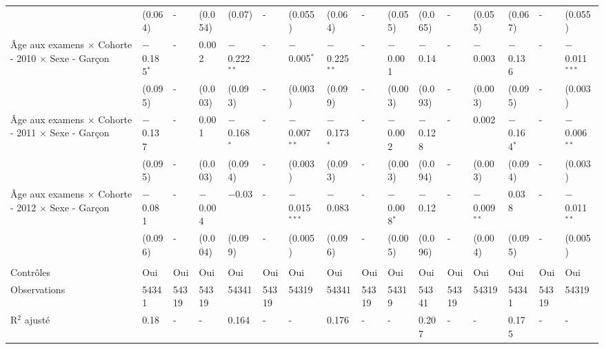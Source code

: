 \documentclass[
]{book}
\begin{document}
\begin{ThreePartTable}
\begin{longtable}[t]{llllllllllllllll}
 & (0.064) & - & (0.054) & (0.07) & - & (0.055) & (0.064) & - & (0.055) & (0.065) & - & (0.055) & (0.067) & - & (0.055)\\
Âge aux examens $\times$ Cohorte - 2010 $\times$ Sexe - Garçon & $-$0.185$^{*}$ & - & 0.002 & $-$0.222$^{**}$ & - & $-$0.005$^{*}$ & $-$0.225$^{**}$ & - & $-$0.001 & $-$0.14 & - & $-$0.003 & $-$0.136 & - & $-$0.011$^{***}$\\
 & (0.095) & - & (0.003) & (0.093) & - & (0.003) & (0.099) & - & (0.003) & (0.093) & - & (0.003) & (0.095) & - & (0.003)\\
Âge aux examens $\times$ Cohorte - 2011 $\times$ Sexe - Garçon & $-$0.137 & - & 0.001 & $-$0.168$^{*}$ & - & $-$0.007$^{**}$ & $-$0.173$^{*}$ & - & $-$0.002 & $-$0.128 & - & 0.002 & $-$0.164$^{*}$ & - & $-$0.006$^{**}$\\
 & (0.095) & - & (0.003) & (0.094) & - & (0.003) & (0.093) & - & (0.003) & (0.094) & - & (0.003) & (0.094) & - & (0.003)\\
Âge aux examens $\times$ Cohorte - 2012 $\times$ Sexe - Garçon & $-$0.081 & - & $-$0.004 & $-$0.03 & - & $-$0.015$^{***}$ & $-$0.083 & - & $-$0.008$^{*}$ & $-$0.12 & - & $-$0.009$^{**}$ & 0.038 & - & $-$0.011$^{**}$\\
 & (0.096) & - & (0.004) & (0.099) & - & (0.005) & (0.096) & - & (0.005) & (0.096) & - & (0.004) & (0.095) & - & (0.005)\\
 &  &  &  &  &  &  &  &  &  &  &  &  &  &  & \\
Contrôles & Oui & Oui & Oui & Oui & Oui & Oui & Oui & Oui & Oui & Oui & Oui & Oui & Oui & Oui & Oui\\
Observations & 54341 & 54319 & 54319 & 54341 & 54319 & 54319 & 54341 & 54319 & 54319 & 54341 & 54319 & 54319 & 54341 & 54319 & 54319\\
R$^2$ ajusté & 0.18 & - & - & 0.164 & - & - & 0.176 & - & - & 0.207 & - & - & 0.175 & - & -\\*
\end{longtable}
\end{ThreePartTable}
\endgroup{}

\newpage

\begingroup\fontsize{4}{6}\selectfont
\end{document}
